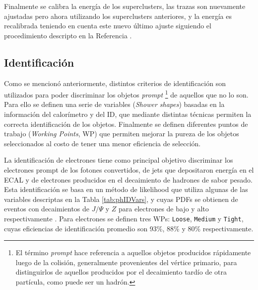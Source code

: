 Finalmente se calibra la energía de los superclusters, las trazas son nuevamente ajustadas pero ahora utilizando los superclusters anteriores, y la energía es recalibrada teniendo en cuenta este nuevo último ajuste siguiendo el procedimiento descripto en la Referencia \cite{PERF-2017-03}.


\subsection{Identificación}\label{sec:ph_id}

Como se mencionó anteriormente, distintos criterios de identificación son utilizados para poder discriminar los objetos \textit{prompt} \footnote{El término \textit{prompt} hace referencia a aquellos objetos producidos rápidamente luego de la colisión, generalmente provenientes del vértice primario, para distinguirlos de aquellos producidos por el decaimiento tardío de otra partícula, como puede ser un hadrón.} 
de aquellos que no lo son. Para ello se definen una serie de variables (\textit{Shower shapes}) basadas en la información del calorímetro y del ID, que mediante distintas técnicas permiten la correcta identificación de los objetos. Finalmente se definen diferentes puntos de trabajo (\textit{Working Points}, WP) que permiten mejorar la pureza de los objetos seleccionados al costo de tener una menor eficiencia de selección.

La identificación de electrones tiene como principal objetivo discriminar los electrones prompt de los fotones convertidos, de jets que depositaron energía en el ECAL y de electrones producidos en el decaimiento de hadrones de sabor pesado. Esta identificación se basa en un método de likelihood que utiliza algunas de las variables descriptas en la Tabla \ref{tab:phIDVars}, y cuyas PDFs se obtienen de eventos con decaimientos de $J/\Psi$ \cite{tesis_fer} y $Z$ para electrones de bajo y alto \ET respectivamente \cite{PERF-2016-01}. Para electrones se definen tres WPs: \texttt{Loose}, \texttt{Medium} y \texttt{Tight}, cuyas eficiencias de identificación promedio son  93\%, 88\% y 80\% respectivamente.

